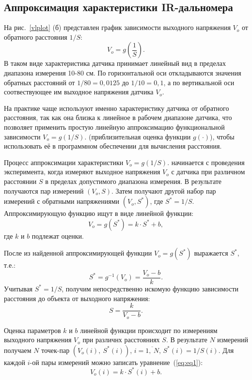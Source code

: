 \documentclass[12pt]{article}
\begin{document}
\subsection{Аппроксимация характеристики IR-дальномера}

На рис.~\ref{vlplot} (б) представлен график зависимости выходного напряжения \(V_o\) от обратного расстояния \(1/S\):
\[V_o=g\left(\frac{1}{S}\right).\]
В таком виде характеристика датчика принимает линейный вид в пределах диапазона измерения 10-80 см. По горизонтальной оси откладываются значения обратных расстояний от \(1/80=0,0125\) до \(1/10=0,1\), а по вертикальной оси соотвествующее им выходное напряжения датчика \(V_o\).

На практике чаще используют именно характеристику датчика от обратного расстояния, так как она близка к линейное в рабочем диапазоне датчика, что позволяет применить простую линейную аппроксимацию функциональной зависимости \(V_o=g\left(1/S\right).\) (приблизительная оценка функции \(g(\cdot)\)), чтобы использовать её в программном обеспечении для вычисления расстояния.

Процесс аппроксимации характеристики \(V_o=g\left(1/S\right).\) начинается с проведения эксперимента, когда измеряют выходное напряжения \(V_o\) с датчика при различном расстоянии \(S\) в пределах допустимого диапазона измерения. В результате получаются пар измерений \((V_o, S)\). Затем получают другой набор пар измерений с обратными напряжениями \((V_o, S^*)\), где  \(S^*=1/S\). Аппроксимирующую функцию ищут в виде линейной функции:
\begin{equation}
    V_o=g(S^*)=k\cdot S^*+b,
    \label{eq:eq1}
\end{equation}
где \(k\) и \(b\) подлежат оценки. 

После из найденной аппроксимирующей функции \(V_o=g(S^*)\) выражается \(S^*\), т.е.:
\[
    S^*=g^{-1}(V_o)=\frac{V_o-b}{k}.
\]
Учитывая \(S^*=1/S\), получим непосредственно искомую функцию зависимости расстояния до объекта от выходного напряжения:
\begin{equation}
    S=\frac{k}{V_o-b}.
    \label{eq:eq0}
\end{equation}

Оценка параметров \(k\) и \(b\) линейной функции происходит по измерениям выходного напряжения \(V_o\) при различнх расстояниях \(S\). В результате \(N\) измерений получаем \(N\) точек-пар \((V_o(i),\: S^*(i))\), \(i=\overline{1,\:N}\), \(S^*(i)=1/S(i)\). Для каждой \(i\)-ой пары измерений можно записать уравнение~(\ref{eq:eq1}):
\[
    V_o(i)=k\cdot S^*(i)+b.
\]
\end{document}
